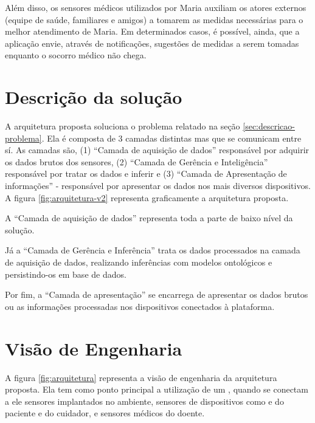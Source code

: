 Além disso, os sensores médicos utilizados por Maria auxiliam os atores
externos (equipe de saúde, familiares e amigos) a tomarem as medidas
necessárias para o melhor atendimento de Maria.  Em determinados casos, é
possível, ainda, que a aplicação envie, através de notificações, sugestões de
medidas a serem tomadas enquanto o socorro médico não chega.

\section{Descrição da solução}
\label{sec:descricao-solucao}

A arquitetura proposta soluciona o problema relatado na seção 
\vref{sec:descricao-problema}. Ela é composta de 3 camadas distintas mas que
se comunicam entre sí. As camadas são, (1) ``Camada de aquisição de dados''
responsável por adquirir os dados brutos dos sensores, (2) ``Camada de Gerência 
e Inteligência'' responsável por tratar os dados e inferir e (3) ``Camada de 
Apresentação de informações'' - responsável por apresentar os dados nos mais
diversos dispositivos. A figura \ref{fig:arquitetura-v2} representa graficamente
a arquitetura proposta.


A ``Camada de aquisição de dados'' representa toda a parte de baixo nível da
solução.

Já a ``Camada de Gerência e Inferência'' trata os dados processados na camada
de aquisição de dados, realizando inferências com modelos ontológicos e 
persistindo-os em base de dados.

Por fim, a ``Camada de apresentação'' se encarrega de apresentar os dados brutos
ou as informações processadas nos dispositivos conectados à plataforma.



\section{Visão de Engenharia} \label{sec:visao-engenharia}

A figura \ref{fig:arquitetura} representa a visão de engenharia da arquitetura
proposta. Ela tem como ponto principal a utilização de um \stb[], quando se
conectam a ele sensores  implantados no ambiente, sensores de dispositivos como
\smartphones[] e  \smartwatches[] do paciente e do cuidador, e sensores médicos
do doente.

